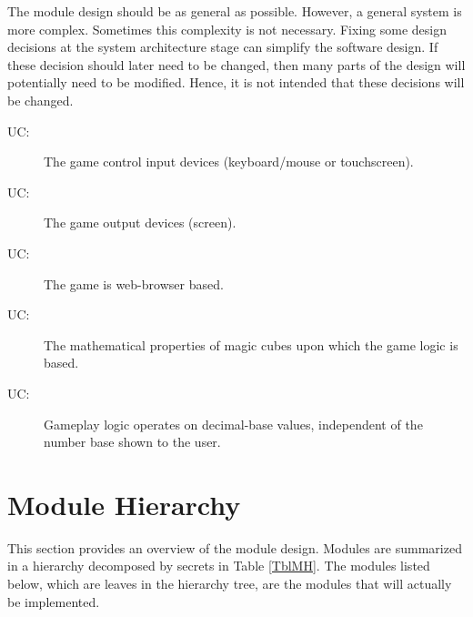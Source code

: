 \documentclass[12pt, titlepage]{article}
\newcounter{ucnum}
\newcommand{\uctheucnum}{UC\theucnum}
\begin{document}
The module design should be as general as possible. However, a general system is
more complex. Sometimes this complexity is not necessary. Fixing some design
decisions at the system architecture stage can simplify the software design. If
these decision should later need to be changed, then many parts of the design
will potentially need to be modified. Hence, it is not intended that these
decisions will be changed.

\begin{description}
\item [ \uctheucnum \label{ucI}:] The game control input devices (keyboard/mouse or touchscreen).
\item [ \uctheucnum \label{ucO}:] The game output devices (screen).
\item [ \uctheucnum \label{ucWB}:] The game is web-browser based.
\item [ \uctheucnum \label{ucM}:] The mathematical properties of magic cubes upon which the game logic is based.
\item [ \uctheucnum \label{ucD}:] Gameplay logic operates on decimal-base values, independent of the number base shown to the user.
\end{description}

\section{Module Hierarchy} \label{SecMH}

This section provides an overview of the module design. Modules are summarized
in a hierarchy decomposed by secrets in Table \ref{TblMH}. The modules listed
below, which are leaves in the hierarchy tree, are the modules that will
actually be implemented.
\end{document}
